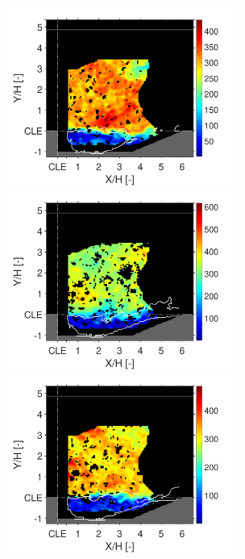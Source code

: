 \begin{figure}
\centering
{}
                {\includegraphics[width=3in,trim=0.35in 0 0.65in 0, clip]{figures/B1/combustion_instability/1/absolute_vel/B1_Frame331.pdf}}
                \hspace{0.4cm}
                {\includegraphics[width=3in,trim=0.35in 0 0.65in 0, clip]{figures/B1/combustion_instability/2/absolute_vel/B1_Frame329.pdf}}
                \newline
{}
                {\includegraphics[width=3in,trim=0.35in 0 0.65in 0, clip]{figures/B1/combustion_instability/3/absolute_vel/B1_Frame342.pdf}}

\end{figure}
